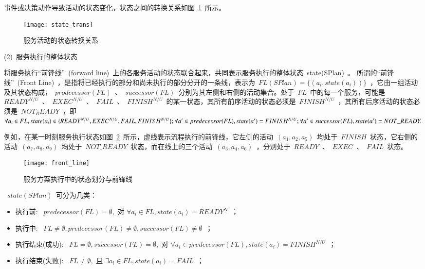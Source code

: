 事件或决策动作导致活动的状态变化，状态之间的转换关系如图~\ref{state_trans}~所示。
\begin{figure}[htbp]
    \centering
    \texttt{[image: state\_trans]}
    \caption{服务活动的状态转换关系}\label{state_trans}
    \vspace{-1em}
\end{figure}

(2)~服务执行的整体状态

将服务执行“前锋线”~(forward line)~上的各服务活动的状态联合起来，共同表示服务执行的整体状态~state(SPlan)~。
所谓的“前锋线”~(Front Line)~，是指将已经执行的部分和尚未执行的部分分开的一条线，表示为~$FL(SPlan)=\{(a_i, state(a_i))\}$~，它由一组活动及其状态构成，~$prodecessor(FL)$~、~$successor(FL)$~分别为其左侧和右侧的活动集合。处于~$FL$~中的每一个服务，可能是~$READY^{N/U}$~、~$EXEC^{N/U}$~、~$FAIL$~、~$FINISH^{N/U}$~的某一状态，其所有前序活动的状态必须是~$FINISH^{N/U}$~，其所有后序活动的状态必须是~$NOT_READY$~，即
$\forall {a_i} \in FL,state({a_i}) \in \{ READ{Y^{N/U}},{\rm{ }}EXE{C^{N/U}},{\rm{ }}FAIL,{\rm{ }}FINIS{H^{N/U}}\} ;\forall a' \in predecessor(FL),state(a') = FINIS{H^{N/U}};\forall a' \in successor(FL),state(a') = NOT\_READY.$

例如，在某一时刻服务执行状态如图~\ref{front_line}~所示，虚线表示流程执行的前锋线，它左侧的活动~$(a_1, a_2, a_5)$~均处于~$FINISH$~状态，它右侧的活动~$(a_7, a_8, a_9)$~均处于~$NOT\_READY$~状态，而在线上的三个活动~$(a_3, a_4, a_6)$~，分别处于~$READY$~、~$EXEC$~、~$FAIL$~状态。

\begin{figure}[htbp]
    \centering
    \texttt{[image: front\_line]}
    \caption{服务方案执行中的状态划分与前锋线}\label{front_line}
    \vspace{-1em}
\end{figure}

~$state(SPlan)$~可分为几类：
\begin{itemize}
\item 执行前: ~$predecessor(FL) = \emptyset ,$ 对 $ \forall {a_i} \in FL,state({a_i}) = READ{Y^N}$~；
\item 执行中: ~$FL \ne \emptyset ,predecessor(FL) \ne \emptyset ,successor(FL) \ne \emptyset $~；
\item 执行结束(成功): ~$FL = \emptyset ,successor(FL) = \emptyset ,$ 对 $\forall {a_i} \in predecessor(FL),state({a_i}) = FINIS{H^{N/U}}$~；
\item 执行结束(失败): ~$FL \ne \emptyset ,$ 且 $\exists {a_i} \in FL,state({a_i}) = FAIL$~；
\end{itemize}

